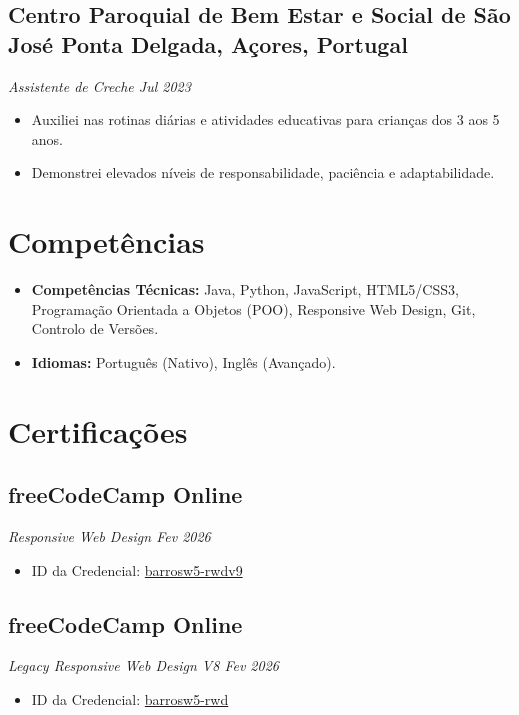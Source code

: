 \documentclass[a4paper,10pt]{article}
\begin{document}
    \subsection*{\texorpdfstring{
            \textbf{Centro Paroquial de Bem Estar e Social de São José} \hfill Ponta Delgada, Açores, Portugal
        }{
            Centro Paroquial de Bem Estar e Social de São José -- Ponta Delgada, Açores, Portugal
        }}
    \textit{Assistente de Creche \hfill Jul 2023}
        \begin{itemize}
            \item Auxiliei nas rotinas diárias e atividades educativas para crianças dos 3 aos 5 anos.
            \item Demonstrei elevados níveis de responsabilidade, paciência e adaptabilidade.
        \end{itemize}


\section{Competências}
    \begin{itemize}
        \item \textbf{Competências Técnicas:} Java, Python, JavaScript, HTML5/CSS3, Programação Orientada a Objetos (POO), Responsive Web Design, Git, Controlo de Versões.
        \item \textbf{Idiomas:} Português (Nativo), Inglês (Avançado).
    \end{itemize}


\section{Certificações}
    \subsection*{\texorpdfstring{
            \textbf{freeCodeCamp} \hfill Online
        }{
            freeCodeCamp -- Online
        }}
    \textit{Responsive Web Design \hfill Fev 2026}
        \begin{itemize}
            \item ID da Credencial: \href{https://www.freecodecamp.org/certification/barrosw5/responsive-web-design-v9}{barrosw5-rwdv9}
        \end{itemize}
        
    \subsection*{\texorpdfstring{
            \textbf{freeCodeCamp} \hfill Online
        }{
            freeCodeCamp -- Online
        }}
    \textit{Legacy Responsive Web Design V8 \hfill Fev 2026}
        \begin{itemize}
            \item ID da Credencial: \href{https://www.freecodecamp.org/certification/barrosw5/responsive-web-design}{barrosw5-rwd}
        \end{itemize}
\end{document}
